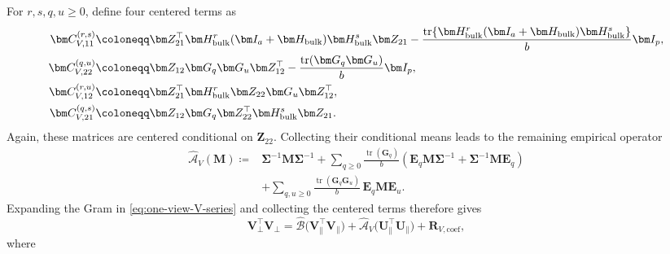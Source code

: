 \documentclass[11pt]{article}
\newcommand{\trans}{\top}
\DeclareMathOperator{\tr}{tr}
\begin{document}
For $r,s,q,u\ge0$, define four centered terms as 
\begin{subequations}
\label{eq:one-view-V-centered-coefficients}
\begin{align}
  \bm C_{V,11}^{(r,s)}
  &\coloneqq
  \bm Z_{21}^\trans
  \bm H_{\rm bulk}^r(\bm I_a+\bm H_{\rm bulk})\bm H_{\rm bulk}^s
  \bm Z_{21}
  -
  \frac{
    \tr\{\bm H_{\rm bulk}^r(\bm I_a+\bm H_{\rm bulk})\bm H_{\rm bulk}^s\}
  }{b}\bm I_p,
  \label{eq:one-view-V-core-11}\\
  \bm C_{V,22}^{(q,u)}
  &\coloneqq
  \bm Z_{12}\bm G_q\bm G_u\bm Z_{12}^\trans
  -
  \frac{\tr(\bm G_q\bm G_u)}{b}\bm I_p,
  \label{eq:one-view-V-core-22}\\
  \bm C_{V,12}^{(r,u)}
  &\coloneqq
  \bm Z_{21}^\trans
  \bm H_{\rm bulk}^r\bm Z_{22}\bm G_u\bm Z_{12}^\trans,
  \label{eq:one-view-V-core-12}\\
  \bm C_{V,21}^{(q,s)}
  &\coloneqq
  \bm Z_{12}\bm G_q\bm Z_{22}^\trans
  \bm H_{\rm bulk}^s\bm Z_{21}.
  \label{eq:one-view-V-core-21}
\end{align}
\end{subequations}
Again, these matrices are centered conditional on $\bm Z_{22}$.  Collecting their
conditional means leads to the remaining empirical operator
\begin{equation}
\label{eq:one-view-empirical-AV}
\begin{aligned}
  \widehat{\mathcal A}_V(\bm M)
  \coloneqq{}&
  \bm\Sigma^{-1}\bm M\bm\Sigma^{-1}
  +
  \sum_{q\ge0}
  \frac{\tr(\bm G_q)}{b}
  \left(
    \bm E_q\bm M\bm\Sigma^{-1}
    +
    \bm\Sigma^{-1}\bm M\bm E_q
  \right)
  \\
  &+
  \sum_{q,u\ge0}
  \frac{\tr(\bm G_q\bm G_u)}{b}\,
  \bm E_q\bm M\bm E_u.
\end{aligned}
\end{equation}
Expanding the Gram in \cref{eq:one-view-V-series} and collecting the centered
terms therefore gives
\begin{equation}
\label{eq:one-view-empirical-V-Gram}
  {\bm V_\perp^\trans\bm V_\perp
  =
  \widehat{\mathcal B}
  \bigl(
    \bm V_\parallel^\trans\bm V_\parallel
  \bigr)
  +
  \widehat{\mathcal A}_V
  \bigl(
    \bm U_\parallel^\trans\bm U_\parallel
  \bigr)
  +
  \bm R_{V,\mathrm{coef}},}
\end{equation}
where
\end{document}
